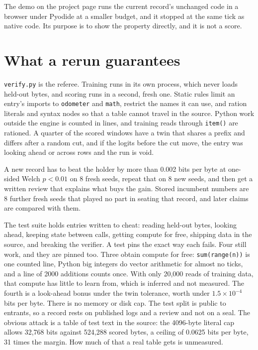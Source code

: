 \documentclass[11pt]{article}
\begin{document}
The demo on the project page runs the current record's unchanged code in a browser under Pyodide at a smaller budget, and it stopped at the same tick as native code. Its purpose is to show the property directly, and it is not a score.

\section{What a rerun guarantees}
\texttt{verify.py} is the referee. Training runs in its own process, which never loads held-out bytes, and scoring runs in a second, fresh one. Static rules limit an entry's imports to \texttt{odometer} and \texttt{math}, restrict the names it can use, and ration literals and syntax nodes so that a table cannot travel in the source. Python work outside the engine is counted in lines, and training reads through \texttt{item()} are rationed. A quarter of the scored windows have a twin that shares a prefix and differs after a random cut, and if the logits before the cut move, the entry was looking ahead or across rows and the run is void.

A new record has to beat the holder by more than 0.002 bits per byte at one-sided Welch $p<0.01$ on 8 fresh seeds, repeat that on 8 new seeds, and then get a written review that explains what buys the gain. Stored incumbent numbers are 8 further fresh seeds that played no part in seating that record, and later claims are compared with them.

The test suite holds \vattacks{} entries written to cheat: reading held-out bytes, looking ahead, keeping state between calls, getting compute for free, shipping data in the source, and breaking the verifier. A test pins the exact way each fails. Four still work, and they are pinned too. Three obtain compute for free: \texttt{sum(range(n))} is one counted line, Python big integers do vector arithmetic for almost no ticks, and a line of 2000 additions counts once. With only 20,000 reads of training data, that compute has little to learn from, which is inferred and not measured. The fourth is a look-ahead bonus under the twin tolerance, worth under $1.5\times10^{-4}$ bits per byte. There is no memory or disk cap. The test split is public to entrants, so a record rests on published logs and a review and not on a seal. The obvious attack is a table of test text in the source: the 4096-byte literal cap allows 32,768 bits against 524,288 scored bytes, a ceiling of 0.0625 bits per byte, 31 times the margin. How much of that a real table gets is unmeasured.
\end{document}
